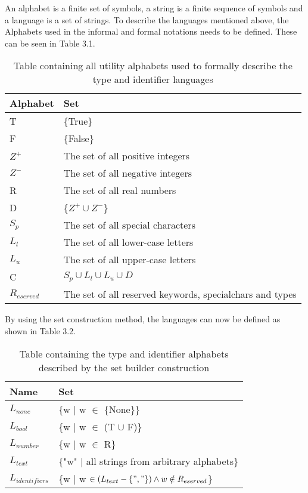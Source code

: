An alphabet is a finite set of symbols, a string is a finite sequence of symbols and a language is a set of strings.
To describe the languages mentioned above, the Alphabets used in the informal and formal notations needs to be defined. 
These can be seen in Table 3.1.

\begin{table}[!htb]
	\centering
	\begin{tabular}{|l|l|}
		\hline
		\textbf{Alphabet} & \textbf{Set}                            \\ \hline
		T                 & \{True\}                                \\ \hline
		F                 & \{False\}                               \\ \hline
		$Z^+$             & The set of all positive integers        \\ \hline
		$Z^-$             & The set of all negative integers        \\ \hline
		R                 & The set of all real numbers             \\ \hline
		D                 & \{$Z^+ \cup Z^-$\}                      \\ \hline
		$S_p$             & The set of all special characters      \\ \hline
		$L_l$             & The set of all lower-case letters       \\ \hline
		$L_u$             & The set of all upper-case letters       \\ \hline
		C                 & $S_p \cup L_l \cup L_u \cup D$          \\ \hline
		$R_{eserved}$     & The set of all reserved keywords, specialchars and types \\ \hline
	\end{tabular}
	\caption{Table containing all utility alphabets used to formally describe the type and identifier languages}
\end{table}

By using the set construction method, the languages can now be defined as shown in Table 3.2.

\begin{table}[!htb]
	\centering
	\begin{tabular}{|l|l|}
		\hline
		\textbf{Name}     & \textbf{Set}                                    \\ \hline
		$L_{none}$        & \{w | w $\in$ \{None\}\}                        \\ \hline
		$L_{bool}$        & \{w | w $\in$ (T $\cup$ F)\}                    \\ \hline
		$L_{number}$      & \{w | w $\in$ R\}                               \\ \hline
		$L_{text}$        & \{"w" | all strings from arbitrary alphabets\}  \\ \hline
		$L_{identifiers}$ & \{w | w $\in (L_{text} - \{", "\}) \wedge w \notin R_{eserved}$\} \\ \hline
	\end{tabular}
	\caption{Table containing the type and identifier alphabets described by the set builder construction}
\end{table}

